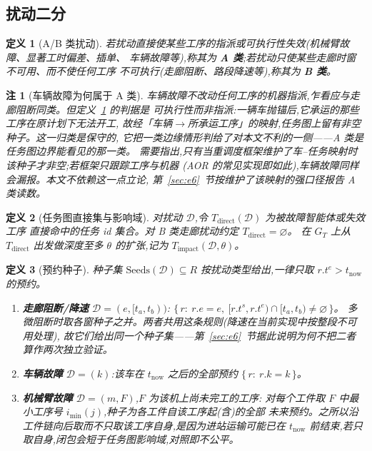 \documentclass[manuscript,screen,review]{acmart}
\newtheorem{definition}{定义}
\newtheorem{remark}{注}
\begin{document}
\subsection{扰动二分}
\label{sec:disturbance_classes}

\begin{definition}[A/B 类扰动]
\label{def:ab}
若扰动直接使某些工序的指派或\emph{可执行性}失效(机械臂故障、显著工时偏差、插单、
车辆故障等),称其为 \textbf{A 类};若扰动只使某些走廊时窗不可用、而不使任何工序
不可执行(走廊阻断、路段降速等),称其为 \textbf{B 类}。
\end{definition}

\begin{remark}[车辆故障为何属于 A 类]
\label{rem:agv_class}
车辆故障不改动任何工序的机器指派,乍看应与走廊阻断同类。但定义~\ref{def:ab} 的判据是
\emph{可执行性}而非指派:一辆车抛锚后,它承运的那些工序在原计划下无法开工,
故经「车辆\(\to\)所承运工序」的映射,任务图上留有非空种子。这一归类是保守的,
它把一类边缘情形判给了对本文\emph{不利}的一侧——A 类是任务图边界能看见的那一类。
需要指出,只有当重调度框架维护了车--任务映射时该种子才非空;若框架只跟踪工序与机器
(AOR 的常见实现即如此),车辆故障同样会漏报。本文不依赖这一点立论,
第~\ref{sec:e6}~节按维护了该映射的强口径报告 A 类读数。
\end{remark}

\begin{definition}[任务图直接集与影响域]
\label{def:task_impact}
对扰动 \(\mathcal{D}\),令 \(T_{\mathrm{direct}}(\mathcal{D})\) 为被故障智能体或失效工序
直接命中的任务 id 集合。对 B 类走廊扰动约定 \(T_{\mathrm{direct}}=\varnothing\)。
在 \(G_T\) 上从 \(T_{\mathrm{direct}}\) 出发做深度至多 \(\theta\) 的扩张,记为
\(T_{\mathrm{impact}}(\mathcal{D},\theta)\)。
\end{definition}

\begin{definition}[预约种子]
\label{def:seeds}
种子集 \(\mathrm{Seeds}(\mathcal{D})\subseteq R\) 按扰动类型给出,一律只取
\(r.t^e>t_{\mathrm{now}}\) 的预约。
\begin{enumerate}[label=(\alph*),leftmargin=1.6em,itemsep=0.15em]
\item \textbf{走廊阻断/降速} \(\mathcal{D}=(e,[t_a,t_b))\):
\(\{\,r:\ r.e=e,\ [r.t^s,r.t^e)\cap[t_a,t_b)\neq\varnothing\,\}\)。
多微阻断时取各窗种子之并。两者共用这条规则(降速在当前实现中按整段不可用处理),
故它们给出同一个种子集——第~\ref{sec:e6}~节据此说明为何不把二者算作两次独立验证。
\item \textbf{车辆故障} \(\mathcal{D}=(k)\):该车在 \(t_{\mathrm{now}}\) 之后的全部预约
\(\{\,r:\ r.k=k\,\}\)。
\item \textbf{机械臂故障} \(\mathcal{D}=(m,F)\),\(F\) 为该机上尚未完工的工序:
对每个工件取 \(F\) 中最小工序号 \(i_{\min}(j)\),种子为各工件自该工序起(含)的全部
未来预约。之所以沿工件链向后取而不只取该工序自身,是因为进站运输可能已在
\(t_{\mathrm{now}}\) 前结束,若只取自身,闭包会短于任务图影响域,对照即不公平。
\end{enumerate}
\end{definition}
\end{document}
